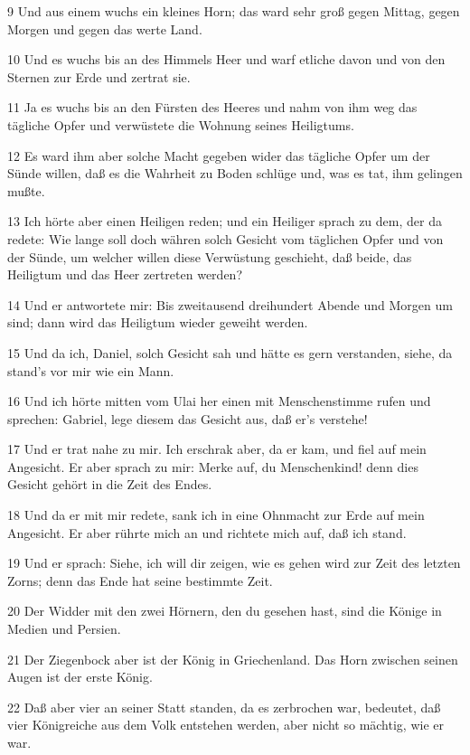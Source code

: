 \par 9 Und aus einem wuchs ein kleines Horn; das ward sehr groß gegen Mittag, gegen Morgen und gegen das werte Land.
\par 10 Und es wuchs bis an des Himmels Heer und warf etliche davon und von den Sternen zur Erde und zertrat sie.
\par 11 Ja es wuchs bis an den Fürsten des Heeres und nahm von ihm weg das tägliche Opfer und verwüstete die Wohnung seines Heiligtums.
\par 12 Es ward ihm aber solche Macht gegeben wider das tägliche Opfer um der Sünde willen, daß es die Wahrheit zu Boden schlüge und, was es tat, ihm gelingen mußte.
\par 13 Ich hörte aber einen Heiligen reden; und ein Heiliger sprach zu dem, der da redete: Wie lange soll doch währen solch Gesicht vom täglichen Opfer und von der Sünde, um welcher willen diese Verwüstung geschieht, daß beide, das Heiligtum und das Heer zertreten werden?
\par 14 Und er antwortete mir: Bis zweitausend dreihundert Abende und Morgen um sind; dann wird das Heiligtum wieder geweiht werden.
\par 15 Und da ich, Daniel, solch Gesicht sah und hätte es gern verstanden, siehe, da stand's vor mir wie ein Mann.
\par 16 Und ich hörte mitten vom Ulai her einen mit Menschenstimme rufen und sprechen: Gabriel, lege diesem das Gesicht aus, daß er's verstehe!
\par 17 Und er trat nahe zu mir. Ich erschrak aber, da er kam, und fiel auf mein Angesicht. Er aber sprach zu mir: Merke auf, du Menschenkind! denn dies Gesicht gehört in die Zeit des Endes.
\par 18 Und da er mit mir redete, sank ich in eine Ohnmacht zur Erde auf mein Angesicht. Er aber rührte mich an und richtete mich auf, daß ich stand.
\par 19 Und er sprach: Siehe, ich will dir zeigen, wie es gehen wird zur Zeit des letzten Zorns; denn das Ende hat seine bestimmte Zeit.
\par 20 Der Widder mit den zwei Hörnern, den du gesehen hast, sind die Könige in Medien und Persien.
\par 21 Der Ziegenbock aber ist der König in Griechenland. Das Horn zwischen seinen Augen ist der erste König.
\par 22 Daß aber vier an seiner Statt standen, da es zerbrochen war, bedeutet, daß vier Königreiche aus dem Volk entstehen werden, aber nicht so mächtig, wie er war.
